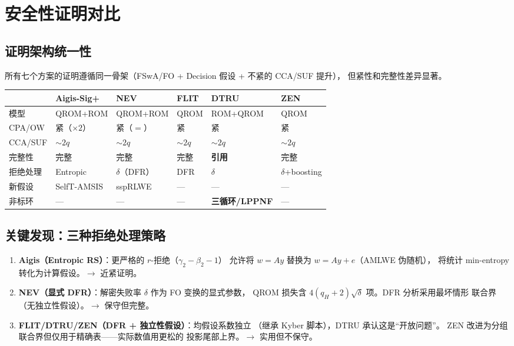 \documentclass[11pt,a4paper]{ctexart}
\begin{document}
\section{安全性证明对比}

\subsection{证明架构统一性}

所有七个方案的证明遵循同一骨架（FSwA/FO + Decision 假设 + 不紧的 CCA/SUF 提升），
但紧性和完整性差异显著。

\begin{table}[htbp]\centering\small
\begin{tabular}{@{}llllll@{}}
\toprule
 & Aigis-Sig+ & NEV & FLIT & DTRU & ZEN \\
\midrule
模型 & QROM+ROM & QROM+ROM & QROM & ROM+QROM & QROM \\
CPA/OW & 紧（$\times 2$） & 紧（$=$） & 紧 & 紧 & 紧 \\
CCA/SUF & $\sim 2q$ & $\sim 2q$ & $\sim 2q$ & $\sim 2q$ & $\sim 2q$ \\
完整性 & 完整 & 完整 & 完整 & \textbf{引用} & 完整 \\
拒绝处理 & Entropic & $\delta$（DFR） & DFR & $\delta$ & $\delta$+boosting \\
新假设 & SelfT-AMSIS & sspRLWE & — & — & — \\
非标环 & — & — & — & \textbf{三循环/LPPNF} & — \\
\bottomrule
\end{tabular}
\end{table}

\subsection{关键发现：三种拒绝处理策略}

\begin{keybox}
\begin{enumerate}
\item \textbf{Aigis（Entropic RS）}：更严格的 $r$-拒绝（$\gamma_2 - \beta_2 - 1$）
      允许将 $w = Ay$ 替换为 $w = Ay + e$（AMLWE 伪随机），
      将统计 min-entropy 转化为计算假设。$\to$ 近紧证明。
\item \textbf{NEV（显式 DFR）}：解密失败率 $\delta$ 作为 FO 变换的显式参数，
      QROM 损失含 $4(q_H+2)\sqrt{\delta}$ 项。DFR 分析采用最坏情形
      联合界（无独立性假设）。$\to$ 保守但完整。
\item \textbf{FLIT/DTRU/ZEN（DFR + 独立性假设）}：均假设系数独立
      （继承 Kyber 脚本），DTRU 承认这是``开放问题''。
      ZEN 改进为分组联合界但仅用于精确表——实际数值用更松的
      投影尾部上界。$\to$ 实用但不保守。
\end{enumerate}
\end{keybox}
\end{document}
